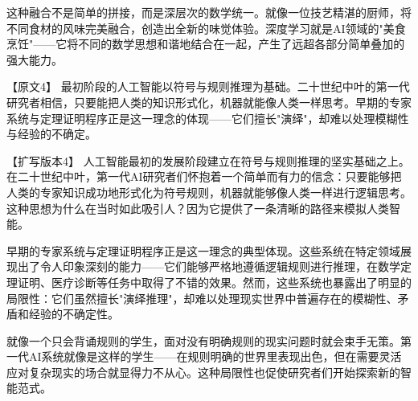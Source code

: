 这种融合不是简单的拼接，而是深层次的数学统一。就像一位技艺精湛的厨师，将不同食材的风味完美融合，创造出全新的味觉体验。深度学习就是AI领域的"美食烹饪"——它将不同的数学思想和谐地结合在一起，产生了远超各部分简单叠加的强大能力。

【原文4】
最初阶段的人工智能以符号与规则推理为基础。二十世纪中叶的第一代研究者相信，只要能把人类的知识形式化，机器就能像人类一样思考。早期的专家系统与定理证明程序正是这一理念的体现——它们擅长"演绎"，却难以处理模糊性与经验的不确定。

【扩写版本4】
人工智能最初的发展阶段建立在符号与规则推理的坚实基础之上。在二十世纪中叶，第一代AI研究者们怀抱着一个简单而有力的信念：只要能够把人类的专家知识成功地形式化为符号规则，机器就能够像人类一样进行逻辑思考。这种思想为什么在当时如此吸引人？因为它提供了一条清晰的路径来模拟人类智能。

早期的专家系统与定理证明程序正是这一理念的典型体现。这些系统在特定领域展现出了令人印象深刻的能力——它们能够严格地遵循逻辑规则进行推理，在数学定理证明、医疗诊断等任务中取得了不错的效果。然而，这些系统也暴露出了明显的局限性：它们虽然擅长"演绎推理"，却难以处理现实世界中普遍存在的模糊性、矛盾和经验的不确定性。

就像一个只会背诵规则的学生，面对没有明确规则的现实问题时就会束手无策。第一代AI系统就像是这样的学生——在规则明确的世界里表现出色，但在需要灵活应对复杂现实的场合就显得力不从心。这种局限性也促使研究者们开始探索新的智能范式。
